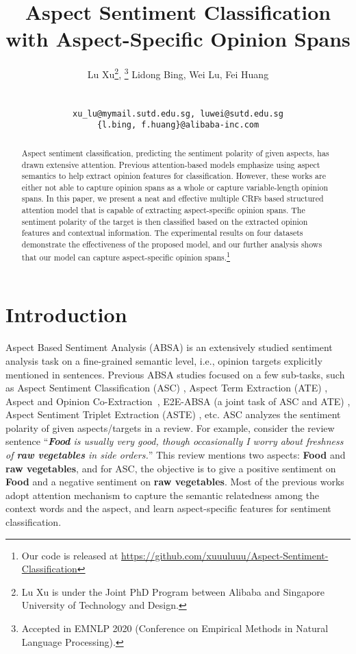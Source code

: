 \documentclass[11pt,a4paper]{article}
\title{Aspect Sentiment Classification with Aspect-Specific Opinion Spans}
\author{Lu Xu\affmark[* 1, 2]\thanks{ Lu Xu is under the Joint PhD Program between Alibaba and Singapore University of Technology and Design.},
\thanks {Accepted in EMNLP 2020 (Conference on Empirical Methods in Natural Language Processing).}
Lidong Bing\affmark[2], Wei Lu\affmark[1], Fei Huang\affmark[2]\\
\affaddr{\affmark[1]StatNLP Research Group, Singapore University of Technology and Design}\\
\affaddr{\affmark[2]DAMO Academy, Alibaba Group}\\
\tt{xu\_lu@mymail.sutd.edu.sg, luwei@sutd.edu.sg}\\
\tt{\{l.bing, f.huang\}@alibaba-inc.com}\\
}
\date{}
\begin{document}
\maketitle
\begin{abstract}
Aspect sentiment classification, predicting the sentiment polarity of given aspects, has drawn extensive attention. 
Previous attention-based models emphasize using aspect semantics to help extract opinion features for classification. 
However, these works are either not able to capture opinion spans as a whole or capture variable-length opinion spans.
In this paper, we present a neat and effective multiple CRFs based structured attention model that is capable of extracting aspect-specific opinion spans. 
The sentiment polarity of the target is then classified based on the extracted opinion features and contextual information.
The experimental results on four datasets demonstrate the effectiveness of the proposed model, and our further analysis shows that our model can capture aspect-specific opinion spans.\footnote{Our code is released at \url{https://github.com/xuuuluuu/Aspect-Sentiment-Classification}}
\end{abstract}


\section{Introduction}
\label{sec:intro}



Aspect Based Sentiment Analysis (ABSA) \cite{Pang:2008:OMS:1454711.1454712, liu2012sentiment} is an extensively studied sentiment analysis task on a fine-grained semantic level, i.e., opinion targets explicitly mentioned in sentences. Previous ABSA studies focused on a few sub-tasks, such as Aspect Sentiment Classification (ASC) \cite{wang-etal-2016-attention,chen-EtAl:2017:EMNLP20171, ma2018targeted}, Aspect Term Extraction (ATE) \cite{li2018aspect,he-etal-2017-unsupervised},  Aspect and Opinion Co-Extraction~\cite{P13-1172, wang2017coupled,P18-2094,dai2019neural}, E2E-ABSA (a joint task of ASC and ATE) \cite{li2019unified,he-etal-2019-interactive,li-etal-2019-transferable}, Aspect Sentiment Triplet Extraction (ASTE) \cite{peng2020, xu2020}, etc. 
ASC analyzes the sentiment polarity of given aspects/targets in a review. For example, consider the review sentence ``\textit{\textbf{Food} is usually very good, though occasionally I worry about freshness of \textbf{raw vegetables} in side orders.}'' This review mentions two aspects: \textbf{Food} and  \textbf{raw vegetables}, and for ASC, the objective is to  give a positive sentiment on \textbf{Food} and a negative sentiment on \textbf{raw vegetables}.
Most of the previous works \cite{wang-etal-2016-attention, chen-EtAl:2017:EMNLP20171, liu-zhang:2017:EACLshort, Yang2017AttentionBL,  Li2018ExploitingCT, he-etal-2018-effective, li-lu-2019-learning, Hu2019LearningTD} adopt attention mechanism \cite{DBLP:journals/corr/BahdanauCB14} to capture the semantic relatedness among the context words and the aspect, and learn aspect-specific features for sentiment classification. 
\end{document}
